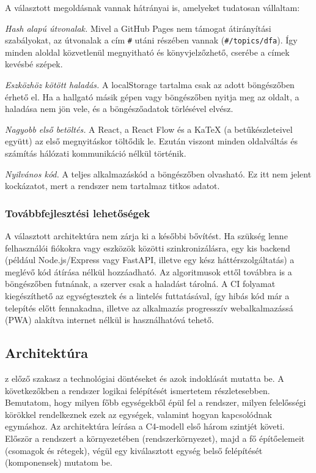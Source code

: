 A választott megoldásnak vannak hátrányai is, amelyeket tudatosan
vállaltam:
\begin{compactitem}
    \item \emph{Hash alapú útvonalak.} Mivel a GitHub Pages nem
          támogat átirányítási szabályokat, az útvonalak a cím
          \texttt{\#} utáni részében vannak (\texttt{\#/topics/dfa}).
          Így minden aloldal közvetlenül megnyitható és
          könyvjelzőzhető, cserébe a címek kevésbé szépek.
    \item \emph{Eszközhöz kötött haladás.} A localStorage tartalma
          csak az adott böngészőben érhető el. Ha a hallgató másik
          gépen vagy böngészőben nyitja meg az oldalt, a haladása
          nem jön vele, és a böngészőadatok törlésével elvész.
    \item \emph{Nagyobb első betöltés.} A React, a React Flow és a
          KaTeX (a betűkészleteivel együtt) az első megnyitáskor
          töltődik le. Ezután viszont minden oldalváltás és számítás
          hálózati kommunikáció nélkül történik.
    \item \emph{Nyilvános kód.} A teljes alkalmazáskód a böngészőben
          olvasható. Ez itt nem jelent kockázatot, mert a rendszer
          nem tartalmaz titkos adatot.
\end{compactitem}

\subsubsection{Továbbfejlesztési lehetőségek}

A választott architektúra nem zárja ki a későbbi bővítést. Ha
szükség lenne felhasználói fiókokra vagy eszközök közötti
szinkronizálásra, egy kis backend (például Node.js/Express vagy
FastAPI, illetve egy kész háttérszolgáltatás) a meglévő kód
átírása nélkül hozzáadható. Az algoritmusok ettől továbbra is a
böngészőben futnának, a szerver csak a haladást tárolná. A CI
folyamat kiegészíthető az egységtesztek és a lintelés futtatásával,
így hibás kód már a telepítés előtt fennakadna, illetve az
alkalmazás progresszív webalkalmazássá (PWA) alakítva internet nélkül
is használhatóvá tehető.

\subsection{Architektúra}
\label{sec:arch}
z előző szakasz a technológiai döntéseket és azok indoklását mutatta be. 
A következőkben a rendszer logikai felépítését ismertetem részletesebben. 
Bemutatom, hogy milyen főbb egységekből épül fel a rendszer, milyen felelősségi 
körökkel rendelkeznek ezek az egységek, valamint hogyan kapcsolódnak egymáshoz. 
Az architektúra leírása a C4-modell első három szintjét követi. Először a rendszert
 a környezetében (rendszerkörnyezet), majd a fő építőelemeit (csomagok és rétegek),
  végül egy kiválasztott egység belső felépítését (komponensek) mutatom be.

